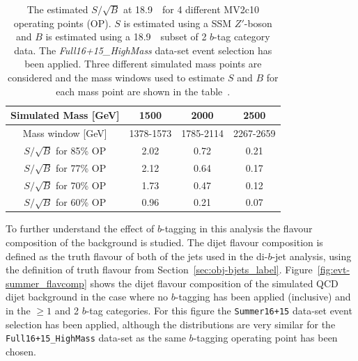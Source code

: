 \begin{table}[ht]
\begin{center}
\begin{tabular}{|c||c|c|c|}
  \hline
  Simulated Mass [GeV]        &  1500  &   2000  &  2500  \\
  \hline
  Mass window [GeV]               & 1378-1573       &  1785-2114   &  2267-2659 \\
  \hline
  $S/\sqrt{B}$ for 85\% OP        &  2.02           &  0.72        &  0.21          \\
  $S/\sqrt{B}$ for 77\% OP        &  2.12           &  0.64        &  0.17          \\
  $S/\sqrt{B}$ for 70\% OP        &  1.73           &  0.47        &  0.12          \\
  $S/\sqrt{B}$ for 60\% OP        &  0.96           &  0.21        &  0.07          \\ \hline
\end{tabular}
\caption[The estimated $S/\sqrt{B}$ at 18.9~\ifb~for 4 different MV2c10 operating points (OP).
  $S$ is estimated using a SSM $Z'$-boson and $B$ is estimated using a 18.9~\ifb~subset of 2 $b$-tag category data.
  The \textit{Full16+15\_HighMass} data-set event selection has been applied.
  Three different simulated mass points are considered and the mass windows used
  to estimate $S$ and $B$ for each mass point are shown in the table.]
        {The estimated $S/\sqrt{B}$ at 18.9~\ifb~for 4 different MV2c10 operating points (OP).
  $S$ is estimated using a SSM $Z'$-boson and $B$ is estimated using a 18.9~\ifb~subset of 2 $b$-tag category data.
  The \textit{Full16+15\_HighMass} data-set event selection has been applied.
  Three different simulated mass points are considered and the mass windows used
  to estimate $S$ and $B$ for each mass point are shown in the table~\cite{dibjet-ichep_int}.}
\vspace{-2em}
\label{tab:evt-btag_hm}
\end{center}
\end{table}

To further understand the effect of $b$-tagging in this analysis the flavour composition of the background is studied.
The dijet flavour composition is defined as the truth flavour of both of the jets used in the di-$b$-jet analysis,
using the definition of truth flavour from Section~\ref{sec:obj-bjets_label}.
Figure~\ref{fig:evt-summer_flavcomp} shows the dijet flavour composition of the simulated QCD dijet background in
the case where no $b$-tagging has been applied (inclusive) and in the $\geq1$ and 2 $b$-tag categories.
For this figure the \verb|Summer16+15| data-set event selection has been applied,
although the distributions are very similar for the \verb|Full16+15_HighMass| data-set
as the same $b$-tagging operating point has been chosen.

